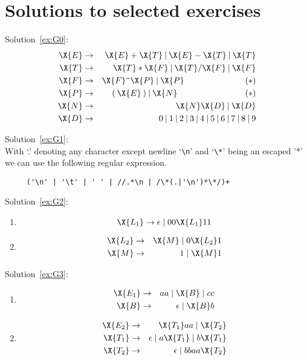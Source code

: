 \newpage
\section*{Solutions to selected exercises}

\newcommand{\M}{\hspace*{1in} (*)}
\noindent Solution~\ref{ex:G0}:\\
\begin{eqnarray*}
  \X{E}  & \rightarrow & \X{E} + \X{T} \:|\:\X{E} - \X{T}\:|\:\X{T} \\
  \X{T}  & \rightarrow & \X{T} * \X{F} \:|\:\X{T} / \X{F}\:|\:\X{F} \\
 \X{F}  & \rightarrow & \X{F} \verb|^| \X{P}  \:|\: \X{P} \M \\
 \X{P}  & \rightarrow & ( \:\X{E}\: ) \:|\: \X{N} \hspace{8pt}\M \\
  \X{N}  & \rightarrow & \X{N} \X{D}\:|\: \X{D} \\
  \X{D}  & \rightarrow & \mbox{0} \:|\: \mbox{1}\:|\: \mbox{2}\:|\: \mbox{3}\:|\: \mbox{4}\:|\: \mbox{5}\:|\: \mbox{6}\:|\: \mbox{7}\:|\: \mbox{8}\:|\: \mbox{9}
\end{eqnarray*}


\noindent Solution~\ref{ex:G1}:\\
With `.' denoting any character except newline `\verb|\n|' and
`\verb|\*|' being an escaped '*' we can use the following regular
expression.
\begin{verbatim}
     ('\n' | '\t' | ' ' | //.*\n | /\*(.|'\n')*\*/)+
\end{verbatim}

\noindent Solution~\ref{ex:G2}:\\
\begin{enumerate}
\item  $$\X{L_1} \rightarrow \epsilon \mid  00\X{L_1}11 $$
\item
\begin{eqnarray*}
  \X{L_2}  & \rightarrow & \X{M} \mid 0\X{L_2}1 \\
  \X{M}  & \rightarrow & 1 \mid \X{M}1 \\
\end{eqnarray*}
\end{enumerate}

\noindent Solution~\ref{ex:G3}:\\
\begin{enumerate}
\item
\begin{eqnarray*}
  \X{E_1}  & \rightarrow & aa \mid \X{B} \mid cc \\
  \X{B}  & \rightarrow & \epsilon \mid \X{B}b \\
\end{eqnarray*}
\item
\begin{eqnarray*}
  \X{E_2}  & \rightarrow & \X{T_1}aa \mid \X{T_2} \\
  \X{T_1}  & \rightarrow & \epsilon \mid a\X{T_1} \mid b\X{T_1} \\
  \X{T_2}  & \rightarrow & \epsilon \mid bbaa\X{T_2} \\
\end{eqnarray*}
\end{enumerate}

